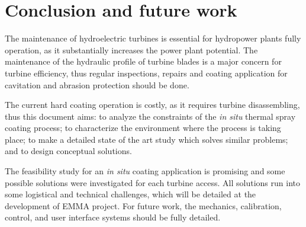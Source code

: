 \section{Conclusion and future work}\label{sec:conclusions}
The maintenance of hydroelectric turbines is essential for hydropower plants
fully operation, as it substantially increases the power plant potential. The
maintenance of the hydraulic profile of turbine blades is a major concern for
turbine efficiency, thus regular inspections, repairs and coating application
for cavitation and abrasion protection should be done.

The current hard coating operation is costly, as it requires turbine
disassembling, thus this document aims: to analyze the constraints of the
\textit{in situ} thermal spray coating process; to characterize the environment
where the process is taking place; to make a detailed state of the art study
which solves similar problems; and to design conceptual solutions.


The feasibility study for an \textit{in situ} coating application is promising
and some possible solutions were investigated for each turbine access. All
solutions run into some logistical and technical challenges, which will be
detailed at the development of EMMA project. For future work, the
mechanics, calibration, control, and user interface systems should be fully
detailed.

